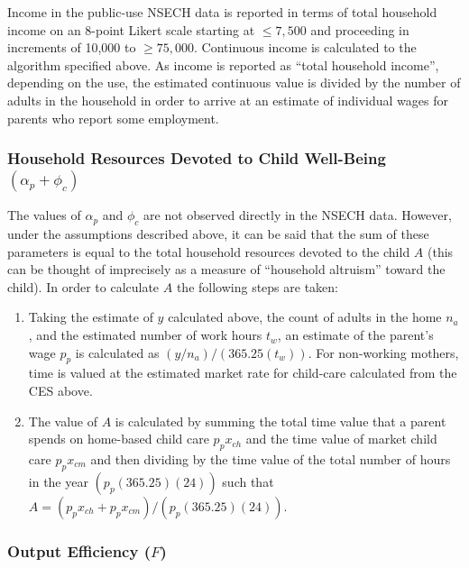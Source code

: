 \documentclass[review]{elsarticle}\usepackage[]{graphicx}\usepackage[]{color}
\begin{document}
Income in the public-use NSECH data is reported in terms of total
household income on an 8-point Likert scale starting at $\le 7,500$ and
proceeding in increments of 10,000 to $\ge 75,000$. Continuous income is
calculated to the algorithm specified above. As income is reported as
``total household income'', depending on the use, the estimated
continuous value is divided by the number of adults in the household in
order to arrive at an estimate of individual wages for parents who
report some employment.

\subsubsection{Household Resources Devoted to Child Well-Being
$(\alpha_p + \phi_c)$}\label{household-resources-devoted-to-child-well-being-alphaux5fp-phiux5fc}

The values of $\alpha_p$ and $\phi_c$ are not observed directly in the
NSECH data. However, under the assumptions described above, it can be
said that the sum of these parameters is equal to the total household
resources devoted to the child $A$ (this can be thought of imprecisely
as a measure of ``household altruism'' toward the child). In order to
calculate $A$ the following steps are taken:

\begin{enumerate}
\def\labelenumi{\arabic{enumi}.}
\item
  Taking the estimate of $y$ calculated above, the count of adults in
  the home $n_a$, and the estimated number of work hours $t_w$, an
  estimate of the parent's wage $p_p$ is calculated as
  $(y/n_a)/(365.25(t_w))$. For non-working mothers, time is valued at
  the estimated market rate for child-care calculated from the CES
  above.
\item
  The value of $A$ is calculated by summing the total time value that a
  parent spends on home-based child care $p_px_{ch}$ and the time value
  of market child care $p_px_{cm}$ and then dividing by the time value
  of the total number of hours in the year $(p_p(365.25)(24))$ such that
  $A=(p_px_{ch}+p_px_{cm})/(p_p(365.25)(24))$.
\end{enumerate}

\subsubsection{Output Efficiency ($F$)}\label{output-efficiency-f}
\end{document}
